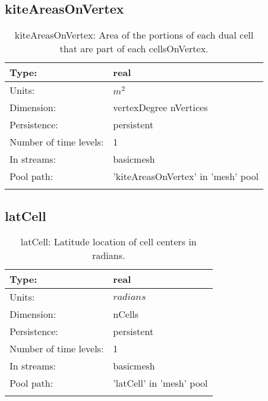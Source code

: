 \subsection[kiteAreasOnVertex]{kiteAreasOnVertex}
\label{subsec:var_sec_mesh_kiteAreasOnVertex}
\begin{center}
\begin{longtable}{| p{2.0in} | p{4.0in} |}
        \hline 
        Type: & real \\
        \hline 
        Units: & $m^2$ \\
        \hline 
        Dimension: & vertexDegree nVertices \\
        \hline 
        Persistence: & persistent \\
        \hline 
        Number of time levels: & 1 \\
        \hline 
		 In streams: &  basicmesh \\
        \hline 
            Pool path: & 'kiteAreasOnVertex' in 'mesh' pool
 \\
		 \hline 
    \caption{kiteAreasOnVertex: Area of the portions of each dual cell that are part of each cellsOnVertex.}
\end{longtable}
\end{center}
\subsection[latCell]{latCell}
\label{subsec:var_sec_mesh_latCell}
\begin{center}
\begin{longtable}{| p{2.0in} | p{4.0in} |}
        \hline 
        Type: & real \\
        \hline 
        Units: & $radians$ \\
        \hline 
        Dimension: & nCells \\
        \hline 
        Persistence: & persistent \\
        \hline 
        Number of time levels: & 1 \\
        \hline 
		 In streams: &  basicmesh \\
        \hline 
            Pool path: & 'latCell' in 'mesh' pool
 \\
		 \hline 
    \caption{latCell: Latitude location of cell centers in radians.}
\end{longtable}
\end{center}
